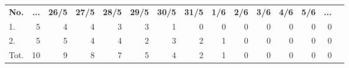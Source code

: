 \documentclass{article}
\begin{document}
\begin{table}[H]
    \centering
    \begin{tabularx}{\textwidth}{| X | r | r | r | r | r | r | r | r | r | r | r | r | r | r |}
        \Xhline{2pt}
        \textbf{No.} & \textbf{...} & \textbf{26/5} & \textbf{27/5} & \textbf{28/5} & \textbf{29/5} & \textbf{30/5} & \textbf{31/5} & \textbf{ 1/6} & \textbf{ 2/6} & \textbf{ 3/6} & \textbf{ 4/6} & \textbf{ 5/6} & \textbf{...}\\
        \Xhline{2pt}
        1. & 5& 4 & 4 & 3 & 3 & 1 & 0 & 0 & 0 & 0 & 0 & 0 & 0 \\
        \hline
        2. & 5 & 5 & 4 & 4 & 2 & 3 & 2 & 1 & 0 & 0 & 0 & 0 & 0 \\
        \hline
        Tot. & 10 & 9 & 8 & 7 & 5 & 4 & 2 & 1 & 0 & 0 & 0 & 0 & 0 \\
        \hline
    \end{tabularx}
\end{table}

\clearpage
\end{document}
